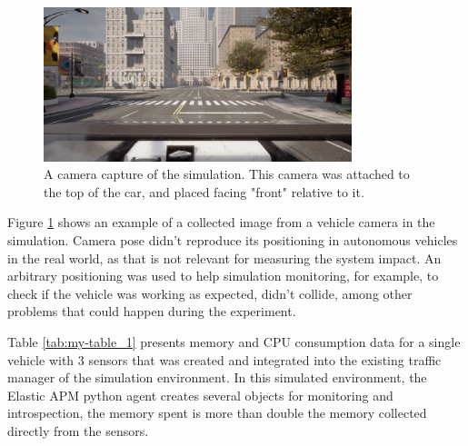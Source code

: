 \begin{figure} [!ht]
    \centering
    \includegraphics[width=0.8\textwidth]{parts/figuras/simulation-capture.png}
    \caption{A camera capture of the simulation. This camera was attached to the top of the car, and placed facing "front" relative to it.}
    \label{fig:simulation-screenshot}
\end{figure}

Figure \ref{fig:simulation-screenshot} shows an example of a collected image from a vehicle camera in the simulation. Camera pose didn't reproduce its positioning in autonomous vehicles in the real world, as that is not relevant for measuring the system impact. An arbitrary positioning was used to help simulation monitoring, for example, to check if the vehicle was working as expected, didn't collide, among other problems that could happen during the experiment.

Table \ref{tab:my-table_1} presents memory and CPU consumption data for a single vehicle with 3 sensors that was created and integrated into the existing traffic manager of the simulation environment. In this simulated environment, the Elastic APM python agent creates several objects for monitoring and introspection, the memory spent is more than double the memory collected directly from the sensors.

\begin{table}[!htb]
\centering
{}
\caption{Total memory and CPU comparison between collection methods. The simulation server is not accounted for.}
\label{tab:my-table_1}
\end{table}

